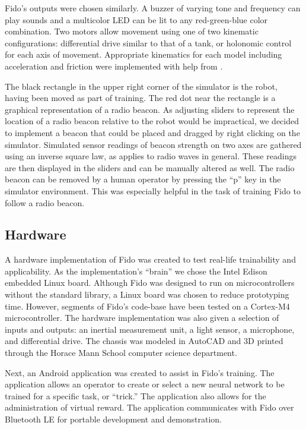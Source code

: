 Fido's outputs were chosen similarly.  A buzzer of varying tone and frequency can play sounds and a multicolor LED can be lit to any red-green-blue color combination. Two motors allow movement using one of two kinematic configurations: differential drive similar to that of a tank, or holonomic control for each axis of movement.  Appropriate kinematics for each model including acceleration and friction were implemented with help from \cite{dudek}.

The black rectangle in the upper right corner of the simulator is the robot, having been moved as part of training.  The red dot near the rectangle is a graphical representation of a radio beacon.  As adjusting sliders to represent the location of a radio beacon relative to the robot would be impractical, we decided to implement a beacon that could be placed and dragged by right clicking on the simulator.  Simulated sensor readings of beacon strength on two axes are gathered using an inverse square law, as applies to radio waves in general.  These readings are then displayed in the sliders and can be manually altered as well.  The radio beacon can be removed by a human operator by pressing the ``p'' key in the simulator environment.  This was especially helpful in the task of training Fido to follow a radio beacon.

\subsection{Hardware}

A hardware implementation of Fido was created to test real-life trainability and applicability.   As the implementation's ``brain'' we chose the Intel Edison embedded Linux board.  Although Fido was designed to run on microcontrollers without the standard library, a Linux board was chosen to reduce prototyping time.  However, segments of Fido's code-base have been tested on a Cortex-M4 microcontroller.   The hardware implementation was also given a selection of inputs and outputs: an inertial measurement unit, a light sensor, a microphone, and differential drive.   The chassis was modeled in AutoCAD and 3D printed through the Horace Mann School computer science department.

Next, an Android application was created to assist in Fido's training.  The application allows an operator to create or select a new neural network to be trained for a specific task, or ``trick.''  The application also allows for the administration of virtual reward.  The application communicates with Fido over Bluetooth LE for portable development and demonstration.  